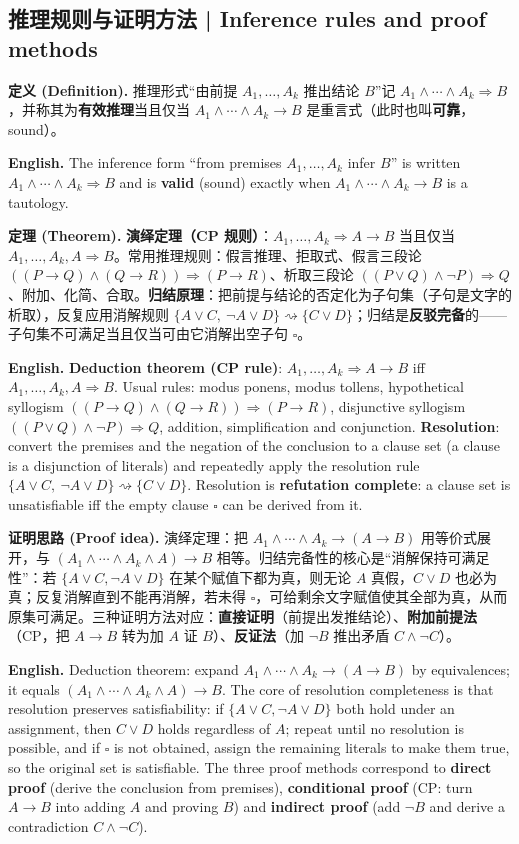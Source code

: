 \documentclass[UTF8,11pt,a4paper]{ctexart}
\newcommand{\EN}[1]{\par\noindent \textbf{English.} #1\par}
\newcommand{\DEF}[2]{\par\noindent\textbf{定义 (Definition).} #1\par\EN{#2}}
\newcommand{\THM}[2]{\par\noindent\textbf{定理 (Theorem).} #1\par\EN{#2}}
\newcommand{\PRF}[2]{\par\noindent\textbf{证明思路 (Proof idea).} #1\par\EN{#2}}
\begin{document}
\subsection{推理规则与证明方法 | Inference rules and proof methods}
\DEF{推理形式“由前提 $A_1,\dots,A_k$ 推出结论 $B$”记 $A_1\wedge\cdots\wedge A_k\Rightarrow B$，并称其为\textbf{有效推理}当且仅当 $A_1\wedge\cdots\wedge A_k\to B$ 是重言式（此时也叫\textbf{可靠}，sound）。}{The inference form ``from premises $A_1,\dots,A_k$ infer $B$'' is written $A_1\wedge\cdots\wedge A_k\Rightarrow B$ and is \textbf{valid} (sound) exactly when $A_1\wedge\cdots\wedge A_k\to B$ is a tautology.}
\THM{\textbf{演绎定理（CP 规则）}：$A_1,\dots,A_k\Rightarrow A\to B$ 当且仅当 $A_1,\dots,A_k,A\Rightarrow B$。常用推理规则：假言推理、拒取式、假言三段论 $((P\to Q)\wedge(Q\to R))\Rightarrow(P\to R)$、析取三段论 $((P\vee Q)\wedge\neg P)\Rightarrow Q$、附加、化简、合取。\textbf{归结原理}：把前提与结论的否定化为子句集（子句是文字的析取），反复应用消解规则 $\{A\vee C,\ \neg A\vee D\}\rightsquigarrow\{C\vee D\}$；归结是\textbf{反驳完备}的——子句集不可满足当且仅当可由它消解出空子句 $\square$。}{\textbf{Deduction theorem (CP rule)}: $A_1,\dots,A_k\Rightarrow A\to B$ iff $A_1,\dots,A_k,A\Rightarrow B$. Usual rules: modus ponens, modus tollens, hypothetical syllogism $((P\to Q)\wedge(Q\to R))\Rightarrow(P\to R)$, disjunctive syllogism $((P\vee Q)\wedge\neg P)\Rightarrow Q$, addition, simplification and conjunction. \textbf{Resolution}: convert the premises and the negation of the conclusion to a clause set (a clause is a disjunction of literals) and repeatedly apply the resolution rule $\{A\vee C,\ \neg A\vee D\}\rightsquigarrow\{C\vee D\}$. Resolution is \textbf{refutation complete}: a clause set is unsatisfiable iff the empty clause $\square$ can be derived from it.}
\PRF{演绎定理：把 $A_1\wedge\cdots\wedge A_k\to(A\to B)$ 用等价式展开，与 $(A_1\wedge\cdots\wedge A_k\wedge A)\to B$ 相等。归结完备性的核心是“消解保持可满足性”：若 $\{A\vee C,\neg A\vee D\}$ 在某个赋值下都为真，则无论 $A$ 真假，$C\vee D$ 也必为真；反复消解直到不能再消解，若未得 $\square$，可给剩余文字赋值使其全部为真，从而原集可满足。三种证明方法对应：\textbf{直接证明}（前提出发推结论）、\textbf{附加前提法}（CP，把 $A\to B$ 转为加 $A$ 证 $B$）、\textbf{反证法}（加 $\neg B$ 推出矛盾 $C\wedge\neg C$）。}{Deduction theorem: expand $A_1\wedge\cdots\wedge A_k\to(A\to B)$ by equivalences; it equals $(A_1\wedge\cdots\wedge A_k\wedge A)\to B$. The core of resolution completeness is that resolution preserves satisfiability: if $\{A\vee C,\neg A\vee D\}$ both hold under an assignment, then $C\vee D$ holds regardless of $A$; repeat until no resolution is possible, and if $\square$ is not obtained, assign the remaining literals to make them true, so the original set is satisfiable. The three proof methods correspond to \textbf{direct proof} (derive the conclusion from premises), \textbf{conditional proof} (CP: turn $A\to B$ into adding $A$ and proving $B$) and \textbf{indirect proof} (add $\neg B$ and derive a contradiction $C\wedge\neg C$).}
\end{document}
